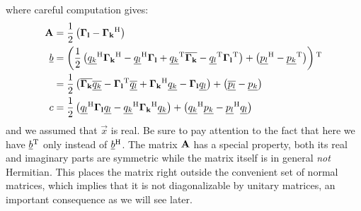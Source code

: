 \documentclass[a4paper,10pt]{article}
\begin{document}
where careful computation gives:
\begin{equation}\label{eq:combined_oscillators}
\begin{split}
  \mathbf{A} & = \frac{1}{2} \left(\mathbf{\Gamma_l} - \mathbf{\Gamma_k}{}^{\textnormal{H}} \right) \\
  \underline{b} & = \left(\frac{1}{2} \left(
                                  \underline{q_k}{}^{\textnormal{H}} \mathbf{\Gamma_k}{}^{\textnormal{H}}
                                 -\underline{q_l}{}^{\textnormal{H}} \mathbf{\Gamma_l}
                                 +\underline{q_k}{}^{\textnormal{T}} \overline{\mathbf{\Gamma_k}}
                                 -\underline{q_l}{}^{\textnormal{T}} \mathbf{\Gamma_l}{}^{\textnormal{T}}
                                \right)
                + \left(\underline{p_l}{}^{\textnormal{H}} - \underline{p_k}{}^{\textnormal{T}}\right)
              \right){}^{\textnormal{T}} \\
          & = \frac{1}{2} \left(
                            \overline{\mathbf{\Gamma_k}} \overline{\underline{q_k}}
                           -\mathbf{\Gamma_l}{}^{\textnormal{T}} \overline{\underline{q_l}}
                           +\mathbf{\Gamma_k}{}^{\textnormal{H}} \underline{q_k}
                           -\mathbf{\Gamma_l} \underline{q_l}
                          \right)
              + \left(\overline{\underline{p_l}} - \underline{p_k}\right) \\
  c & = \frac{1}{2} \left(
                      \underline{q_l}{}^{\textnormal{H}} \mathbf{\Gamma_l} \underline{q_l}
                     -\underline{q_k}{}^{\textnormal{H}} \mathbf{\Gamma_k}{}^{\textnormal{H}} \underline{q_k}
                    \right)
        + \left(\underline{q_k}{}^{\textnormal{H}} \underline{p_k} - \underline{p_l}{}^{\textnormal{H}} \underline{q_l}\right)
\end{split}
\end{equation}
and we assumed that $\vec{x}$ is real. Be sure to pay attention to
the fact that here we have $\underline{b}{}^{\textnormal{T}}$ only instead of $\underline{b}{}^{\textnormal{H}}$.
The matrix $\mathbf{A}$ has a special property, both its real and
imaginary parts are symmetric while the matrix itself is in general
\emph{not} Hermitian. This places the matrix right outside the convenient
set of normal matrices, which implies that it is not diagonalizable
by unitary matrices,  an important  consequence as we will see later.
\end{document}
